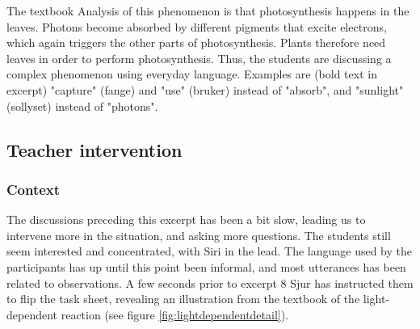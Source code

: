  The textbook Analysis of this phenomenon is that photosynthesis happens in the leaves. Photons become absorbed by different pigments that excite electrons, which again triggers the other parts of photosynthesis. Plants therefore need leaves in order to perform photosynthesis. Thus, the students are discussing a complex phenomenon using everyday language. Examples are (bold text in excerpt) "capture" (fange) and "use" (bruker) instead of "absorb", and "sunlight" (sollyset) instead of "photons". 

\subsection{Teacher intervention}

\subsubsection*{Context}
The discussions preceding this excerpt has been a bit slow, leading us to intervene more in the situation, and asking more questions. The students still seem interested and concentrated, with Siri in the lead. The language used by the participants has up until this point been informal, and most utterances has been related to observations. A few seconds prior to excerpt 8 Sjur has instructed them to flip the task sheet, revealing an illustration from the textbook of the light-dependent reaction (see figure \ref{fig:lightdependentdetail}).

